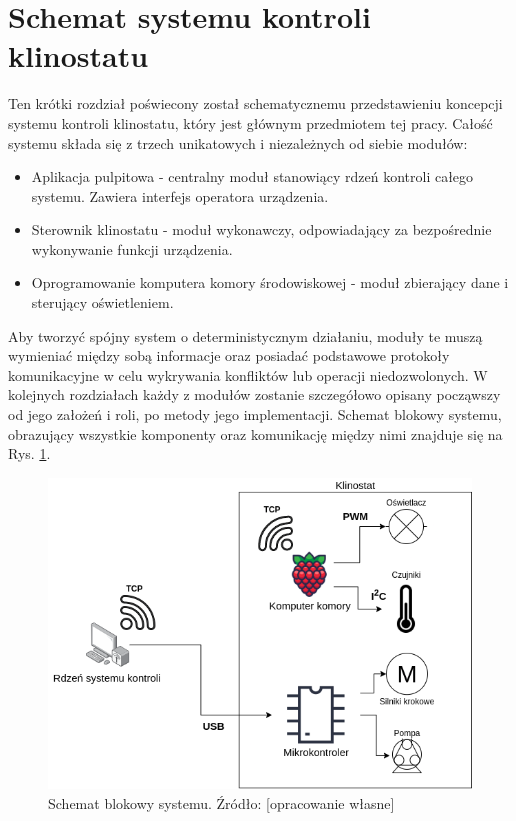 \graphicspath{{./System/images}}

\chapter*{Schemat systemu kontroli klinostatu}

Ten krótki rozdział poświecony został schematycznemu przedstawieniu koncepcji systemu kontroli klinostatu, który jest głównym przedmiotem tej pracy. Całość systemu składa się z trzech unikatowych i niezależnych od siebie modułów:
\begin{itemize}

	\item Aplikacja pulpitowa - centralny moduł stanowiący rdzeń kontroli całego systemu. Zawiera interfejs operatora urządzenia.
	\item Sterownik klinostatu - moduł wykonawczy, odpowiadający za bezpośrednie wykonywanie funkcji urządzenia.
	\item Oprogramowanie komputera komory środowiskowej - moduł zbierający dane i sterujący oświetleniem.

\end{itemize}

Aby tworzyć spójny system o deterministycznym działaniu, moduły te muszą wymieniać między sobą informacje oraz posiadać podstawowe protokoły komunikacyjne w celu wykrywania konfliktów lub operacji niedozwolonych. W kolejnych rozdziałach każdy z modułów zostanie szczegółowo opisany począwszy od  jego założeń i roli, po metody jego implementacji. Schemat blokowy systemu, obrazujący wszystkie komponenty oraz komunikację między nimi znajduje się na Rys. \ref{fig:schemat_blokowy}.

\begin{figure}[ht]
	
	\centering
	\includegraphics[scale=.6]{schemat_system}
	\caption{Schemat blokowy systemu. Źródło: [opracowanie własne]}
	\label{fig:schemat_blokowy}
	
\end{figure}